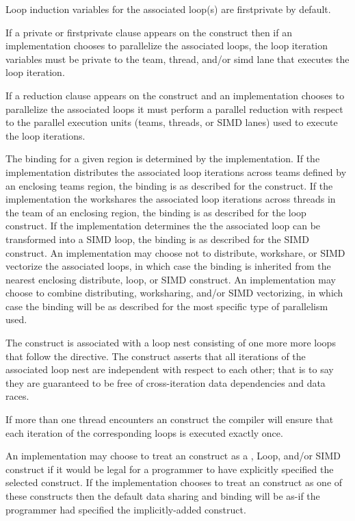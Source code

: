 Loop induction variables for the associated loop(s) are firstprivate by
default.

If a private or firstprivate clause appears on the  construct then
if an implementation chooses to parallelize the associated loops, the loop
iteration variables must be private to the team, thread, and/or simd lane that
executes the loop iteration.

If a reduction clause appears on the  construct and an
implementation chooses to parallelize the associated loops it must perform a
parallel reduction with respect to the parallel execution units (teams,
threads, or SIMD lanes) used to execute the loop iterations.


\binding
The binding for a given  region is determined by the implementation.
If the implementation distributes the associated loop iterations across teams
defined by an enclosing teams region, the binding is as described for the
 construct. If the implementation the workshares the associated loop
iterations across threads in the team of an enclosing  region, the
binding is as described for the loop construct. If the implementation
determines the the associated loop can be transformed into a SIMD loop, the
binding is as described for the SIMD construct. An implementation may choose
not to distribute, workshare, or SIMD vectorize the associated loops, in which
case the binding is inherited from the nearest enclosing distribute, loop, or
SIMD construct. An implementation may choose to combine distributing,
worksharing, and/or SIMD vectorizing, in which case the binding will be as
described for the most specific type of parallelism used.

\descr
The  construct is associated with a loop nest consisting of one more
more loops that follow the directive. The construct asserts that all iterations
of the associated loop nest are independent with respect to each other; that is
to say they are guaranteed to be free of cross-iteration data dependencies and
data races. 

If more than one thread encounters an  construct the compiler will
ensure that each iteration of the corresponding loops is executed exactly once.

An implementation may choose to treat an  construct as a
,
Loop, and/or SIMD construct if it would be legal for a programmer to have
explicitly specified the selected construct. If the implementation chooses to
treat an  construct as one of these constructs then the default data
sharing and binding will be as-if the programmer had specified the
implicitly-added construct.


